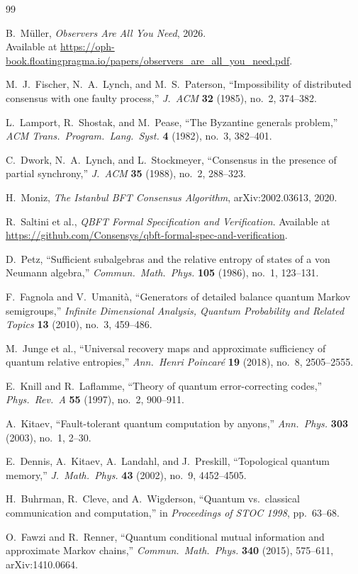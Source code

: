 \documentclass[11pt]{article}
\theoremstyle{remark}
\theoremstyle{plain}
\begin{document}
\begin{thebibliography}{99}

B.~M\"uller,
\emph{Observers Are All You Need},
2026.\\
Available at \url{https://oph-book.floatingpragma.io/papers/observers_are_all_you_need.pdf}.

M.~J.~Fischer, N.~A.~Lynch, and M.~S.~Paterson,
``Impossibility of distributed consensus with one faulty process,''
\emph{J.\ ACM} \textbf{32} (1985), no.~2, 374--382.

L.~Lamport, R.~Shostak, and M.~Pease,
``The Byzantine generals problem,''
\emph{ACM Trans.\ Program.\ Lang.\ Syst.} \textbf{4} (1982), no.~3, 382--401.

C.~Dwork, N.~A.~Lynch, and L.~Stockmeyer,
``Consensus in the presence of partial synchrony,''
\emph{J.\ ACM} \textbf{35} (1988), no.~2, 288--323.

H.~Moniz,
\emph{The Istanbul BFT Consensus Algorithm},
arXiv:2002.03613, 2020.

R.~Saltini et al.,
\emph{QBFT Formal Specification and Verification}.
Available at \url{https://github.com/Consensys/qbft-formal-spec-and-verification}.

D.~Petz,
``Sufficient subalgebras and the relative entropy of states of a von Neumann algebra,''
\emph{Commun.\ Math.\ Phys.} \textbf{105} (1986), no.~1, 123--131.

F.~Fagnola and V.~Umanit\`a,
``Generators of detailed balance quantum Markov semigroups,''
\emph{Infinite Dimensional Analysis, Quantum Probability and Related Topics}
\textbf{13} (2010), no.~3, 459--486.

M.~Junge et al.,
``Universal recovery maps and approximate sufficiency of quantum relative entropies,''
\emph{Ann.\ Henri Poincar\'e} \textbf{19} (2018), no.~8, 2505--2555.

E.~Knill and R.~Laflamme,
``Theory of quantum error-correcting codes,''
\emph{Phys.\ Rev.\ A} \textbf{55} (1997), no.~2, 900--911.

A.~Kitaev,
``Fault-tolerant quantum computation by anyons,''
\emph{Ann.\ Phys.} \textbf{303} (2003), no.~1, 2--30.

E.~Dennis, A.~Kitaev, A.~Landahl, and J.~Preskill,
``Topological quantum memory,''
\emph{J.\ Math.\ Phys.} \textbf{43} (2002), no.~9, 4452--4505.

H.~Buhrman, R.~Cleve, and A.~Wigderson,
``Quantum vs.\ classical communication and computation,''
in \emph{Proceedings of STOC 1998}, pp.~63--68.

O.~Fawzi and R.~Renner,
``Quantum conditional mutual information and approximate Markov chains,''
\emph{Commun.\ Math.\ Phys.} \textbf{340} (2015), 575--611,
arXiv:1410.0664.

\end{thebibliography}
\end{document}
